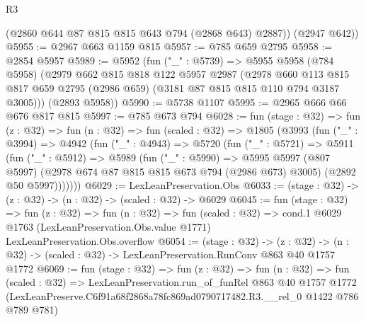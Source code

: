 \begin{lexlean}{R3}
\begin{coremodule}
        (@2860 @644 @87 @815 @815 @643 @794 (@2868 @643) @2887))
      (@2947 @642))
@5955 := @2967 @663 @1159 @815
@5957 := @785 @659 @2795
@5958 := @2854 @5957
@5989 := @5952
    (fun ("_" : @5739) =>
    @5955
      @5958
      (@784 @5958)
      (@2979
        @662
        @815
        @818
        @122
        @5957
        @2987
        (@2978
          @660
          @113
          @815
          @817
          @659
          @2795
          (@2986 @659)
          (@3181 @87 @815 @815 @110 @794 @3187 @3005)))
      (@2893 @5958))
@5990 := @5738 @1107
@5995 := @2965 @666 @66 @676 @817 @815
@5997 := @785 @673 @794
@6028 := fun (stage : @32) =>
  fun (z : @32) =>
  fun (n : @32) =>
  fun (scaled : @32) =>
  @1805
    (@3993
      (fun ("_" : @3994) =>
      @4942
        (fun ("_" : @4943) =>
        @5720
          (fun ("_" : @5721) =>
          @5911
            (fun ("_" : @5912) =>
            @5989
              (fun ("_" : @5990) =>
              @5995
                @5997
                (@807 @5997)
                (@2978 @674 @87 @815 @815 @673 @794 (@2986 @673) @3005)
                (@2892 @50 @5997)))))))
@6029 := LexLeanPreservation.Obs
@6033 := (stage : @32) -> (z : @32) -> (n : @32) -> (scaled : @32) -> @6029
@6045 := fun (stage : @32) =>
  fun (z : @32) =>
  fun (n : @32) =>
  fun (scaled : @32) =>
  cond.{1} @6029 @1763 (LexLeanPreservation.Obs.value @1771) LexLeanPreservation.Obs.overflow
@6054 := (stage : @32) ->
  (z : @32) -> (n : @32) -> (scaled : @32) -> LexLeanPreservation.RunConv @863 @40 @1757 @1772
@6069 := fun (stage : @32) =>
  fun (z : @32) =>
  fun (n : @32) =>
  fun (scaled : @32) =>
  LexLeanPreservation.run_of_funRel
    @863
    @40
    @1757
    @1772
    (LexLeanPreserve.C6f91a68f2868a78fc869ad0790717482.R3.__rel_0 @1422 @786 @789 @781)
\end{coremodule}
\end{lexlean}
